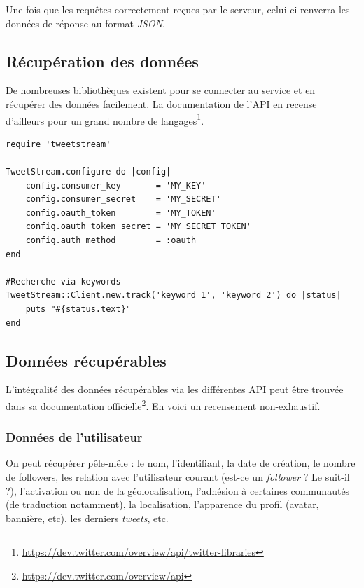         Une fois que les requêtes correctement reçues par le serveur, celui-ci renverra les données de réponse au format \emph{JSON}.
        
    \subsection{Récupération des données}
        De nombreuses bibliothèques existent pour se connecter au service et en récupérer des données facilement.
        La documentation de l'API en recense d'ailleurs pour un grand nombre de langages\footnote{\url{https://dev.twitter.com/overview/api/twitter-libraries}}.
        
        \lstset{style=RubyStyle}
        \begin{lstlisting}[caption=Exemple de recherche sur l'API Streaming avec la \emph{RubyGem} \textbf{TweetStream} (\url{https://github.com/tweetstream/tweetstream})]
require 'tweetstream'

TweetStream.configure do |config|
	config.consumer_key       = 'MY_KEY'
	config.consumer_secret    = 'MY_SECRET'
	config.oauth_token        = 'MY_TOKEN'
	config.oauth_token_secret = 'MY_SECRET_TOKEN'
	config.auth_method        = :oauth
end

#Recherche via keywords
TweetStream::Client.new.track('keyword 1', 'keyword 2') do |status|
	puts "#{status.text}"
end
        \end{lstlisting}
        
        
    \subsection{Données récupérables}
        L'intégralité des données récupérables via les différentes API peut être trouvée dans sa documentation officielle\footnote{\url{https://dev.twitter.com/overview/api}}.
        En voici un recensement non-exhaustif.
        
        \subsubsection{Données de l'utilisateur}
            On peut récupérer pêle-mêle : le nom, l'identifiant, la date de création, le nombre de followers, les relation avec l'utilisateur courant (est-ce un \emph{follower} ? Le suit-il ?), l'activation ou non de la géolocalisation, l'adhésion à certaines communautés (de traduction notamment), la localisation, l'apparence du profil (avatar, bannière, etc), les derniers \emph{tweets}, etc.
            
